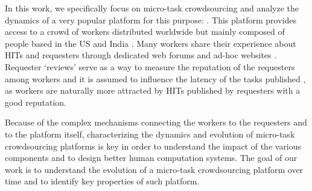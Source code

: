 In this work, we specifically focus on micro-task crowdsourcing and analyze the dynamics of a  very popular  platform for this purpose: \amt{}. This platform provides access to a crowd of workers distributed worldwide but mainly composed of people based in the US and India \cite{mturk}. Many \amt{} workers share their experience about HITs and requesters through dedicated web forums and ad-hoc websites \cite{turkopticon}. Requester `reviews' serve as a way to measure the reputation of the requesters among workers and it is assumed to influence the latency of the tasks published \cite{TOreputation}, as workers are naturally more attracted by HITs published by  requesters with a good reputation.





Because of the complex mechanisms connecting the workers to the requesters and to the platform itself, characterizing the dynamics and evolution of micro-task crowdsourcing platforms is key in order to understand the impact of the various components and to design better human computation systems. The goal of our work is to understand the evolution of a micro-task crowdsourcing platform over time and to identify key properties of such platform.

